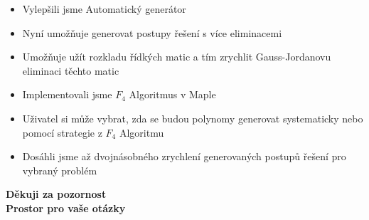 \documentclass[cmpiitalkstyle, 25pt]{cmptalk}
\begin{document}
\begin{cmptalkslide}[Shrnutí]
  \begin{itemize}
    \item Vylepšili jsme Automatický generátor \cite{AutoGen}
    \item Nyní umožňuje generovat postupy řešení s více eliminacemi
    \item Umožňuje užít rozkladu řídkých matic a tím zrychlit Gauss-Jordanovu eliminaci těchto matic
    \item Implementovali jsme $F_4$ Algoritmus v Maple
    \item Uživatel si může vybrat, zda se budou polynomy generovat systematicky nebo pomocí strategie z $F_4$ Algoritmu \cite{F4}
    \item Dosáhli jsme až dvojnásobného zrychlení generovaných postupů řešení pro vybraný problém \cite{9pt}
  \end{itemize}
\end{cmptalkslide}

\begin{cmptalkslide}
  
  {\small{}}
\end{cmptalkslide}

\begin{cmptalkslide}[]
  \begin{center}
  \vfill
  {\Large \textbf{Děkuji za pozornost}}\\[5cm]
  {\large \textbf{Prostor pro vaše otázky}}
  \vfill
  \end{center}
\end{cmptalkslide}
\end{document}
